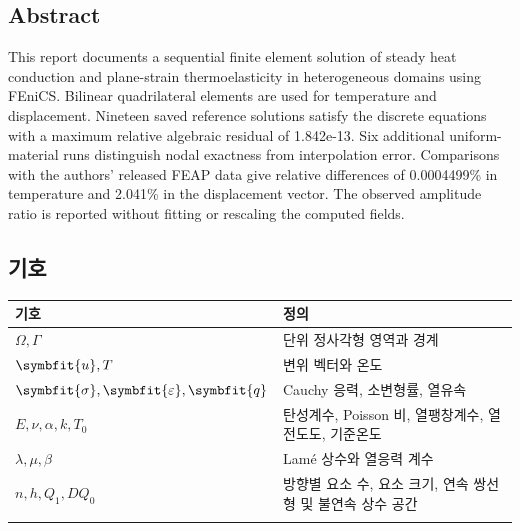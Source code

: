 \documentclass[10pt,a4paper]{article}
\renewcommand{\boldsymbol}[1]{\symbfit{#1}}
\begin{document}
\clearpage

\subsection{Abstract}

This report documents a sequential finite element solution of steady heat conduction and plane-strain thermoelasticity in heterogeneous domains using FEniCS. Bilinear quadrilateral elements are used for temperature and displacement. Nineteen saved reference solutions satisfy the discrete equations with a maximum relative algebraic residual of 1.842e-13. Six additional uniform-material runs distinguish nodal exactness from interpolation error. Comparisons with the authors' released FEAP data give relative differences of 0.0004499\% in temperature and 2.041\% in the displacement vector. The observed amplitude ratio is reported without fitting or rescaling the computed fields.\par

\subsection{기호}

\begingroup\small

\par\begin{minipage}{\linewidth}\begin{tabular}{>{\raggedright\arraybackslash}p{}>{\raggedright\arraybackslash}p{}}

\rowcolor{tint} \textbf{기호} & \textbf{정의}\\\midrule

$\Omega,\Gamma$ & 단위 정사각형 영역과 경계\\\addlinespace[2pt]

$\boldsymbol u,T$ & 변위 벡터와 온도\\\addlinespace[2pt]

$\boldsymbol\sigma,\boldsymbol\varepsilon,\boldsymbol q$ & Cauchy 응력, 소변형률, 열유속\\\addlinespace[2pt]

$E,\nu,\alpha,k,T_0$ & 탄성계수, Poisson 비, 열팽창계수, 열전도도, 기준온도\\\addlinespace[2pt]

$\lambda,\mu,\beta$ & Lamé 상수와 열응력 계수\\\addlinespace[2pt]

$n,h,Q_1,DQ_0$ & 방향별 요소 수, 요소 크기, 연속 쌍선형 및 불연속 상수 공간\\\addlinespace[2pt]

\bottomrule\end{tabular}\end{minipage}\par\vspace{5pt}\endgroup
\end{document}
